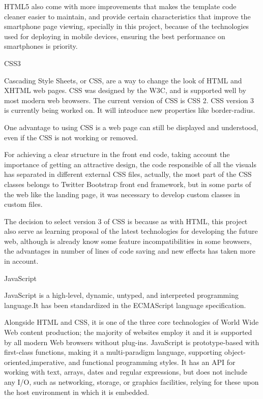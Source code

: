 \documentclass{DeustoFDP}
\begin{document}
HTML5 also come with more improvements that makes the template code cleaner easier to maintain, and provide certain characteristics that improve the smartphone page viewing, specially in this project, because of the technologies used for deploying in mobile devices, ensuring the best performance on smartphones is priority.

{\large CSS3}

Cascading Style Sheets, or CSS, are a way to change the look of HTML and XHTML web pages. CSS was designed by the W3C, and is supported well by most modern web browsers. The current version of CSS is CSS 2. CSS version 3 is currently being worked on. It will introduce new properties like border-radius. \cite{css}

One advantage to using CSS is a web page can still be displayed and understood, even if the CSS is not working or removed.

For achieving a clear structure in the front end code, taking account the importance of getting an attractive design, the code responsible of all the visuals has separated in different external CSS files, actually, the most part of the CSS classes belongs to Twitter Bootstrap front end framework, but in some parts of the web like the landing page, it was necessary to develop custom classes in custom files.

The decision to select version 3 of CSS is because as with HTML, this project also serve as learning proposal of the latest technologies for developing the future web, although is already know some feature incompatibilities in some browsers, the advantages in number of lines of code saving and new effects has taken more in account.

{\large JavaScript}

JavaScript is a high-level, dynamic, untyped, and interpreted programming language.It has been standardized in the ECMAScript language specification. 

Alongside HTML and CSS, it is one of the three core technologies of World Wide Web content production; the majority of websites employ it and it is supported by all modern Web browsers without plug-ins. JavaScript is prototype-based with first-class functions, making it a multi-paradigm language, supporting object-oriented,imperative, and functional programming styles. It has an API for working with text, arrays, dates and regular expressions, but does not include any I/O, such as networking, storage, or graphics facilities, relying for these upon the host environment in which it is embedded. \cite{javascript}
\end{document}

